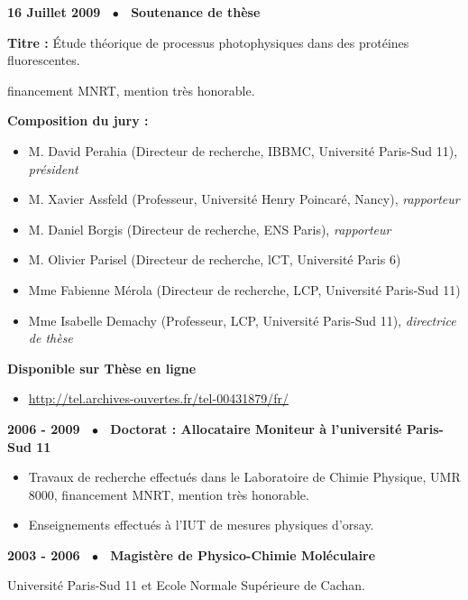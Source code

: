 \documentclass[11pt]{artuppax}
\newcommand*{\bul}{~$\bullet$~\xspace}
\begin{document}
\begin{description}
	\item \textbf{16 Juillet 2009 \bul Soutenance de thèse}
	\begin{description}
		\item \textbf{Titre : } Étude théorique de processus photophysiques dans des
		protéines fluorescentes.
		\item financement MNRT, mention très honorable.
		\item \textbf{Composition du jury : }
		\begin{itemize}
			\item M. David Perahia (Directeur de recherche, IBBMC, Université Paris-Sud 11),
				\textit{président}
			\item M. Xavier Assfeld (Professeur, Université Henry Poincaré, Nancy),
			\textit{rapporteur}
			\item M. Daniel Borgis (Directeur de recherche, ENS Paris), \textit{rapporteur}
			\item M. Olivier Parisel (Directeur de recherche, lCT, Université Paris 6)
			\item Mme Fabienne Mérola (Directeur de recherche, LCP, Université Paris-Sud 11)
			\item Mme Isabelle Demachy (Professeur, LCP, Université Paris-Sud 11),
				\textit{directrice de thèse}
		\end{itemize}

		\item \textbf{Disponible sur Thèse en ligne}
			\begin{itemize}
				\item \url{http://tel.archives-ouvertes.fr/tel-00431879/fr/}
			\end{itemize}
	\end{description}

	\item \textbf{2006 - 2009 \bul Doctorat : Allocataire Moniteur à l'université Paris-Sud 11}
	\begin{itemize}
		\item[] Travaux de recherche effectués dans le Laboratoire de Chimie Physique,
		UMR 8000, financement MNRT, mention très honorable.
		\item[] Enseignements effectués à l'IUT de mesures physiques d'orsay.
	\end{itemize}

	\item \textbf{2003 - 2006 \bul Magistère de Physico-Chimie Moléculaire}
	\begin{description}
		\item Université Paris-Sud 11 et Ecole Normale Supérieure de Cachan.
	\end{description}


\end{description}
\end{document}
